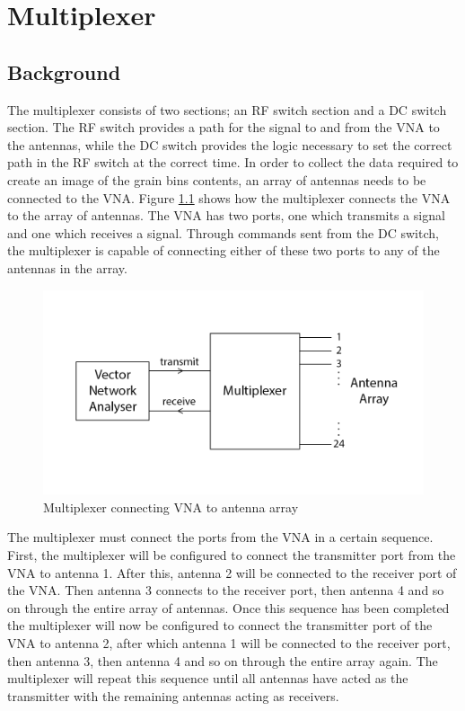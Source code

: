 \chapter{Multiplexer}
\label{sec:Multiplexer}

\section{Background}

The multiplexer consists of two sections; an RF switch section and a DC switch section. The RF switch provides a path for the signal to and from the VNA to the antennas, while the DC switch provides the logic necessary to set the correct path in the RF switch at the correct time. In order to collect the data required to create an image of the grain bins contents, an array of antennas needs to be connected to the VNA. Figure \ref{fig:mp_connections} shows how the multiplexer connects the VNA to the array of antennas. The VNA has two ports, one which transmits a signal and one which receives a signal. Through commands sent from the DC switch, the multiplexer is capable of connecting either of these two ports to any of the antennas in the array.

\begin{figure}[h]
	\begin{center}
		\includegraphics[width=4.5in]{./images/multiplexer_connections.png}
		\caption{Multiplexer connecting VNA to antenna array}
		\label{fig:mp_connections}
	\end{center}
\end{figure}

The multiplexer must connect the ports from the VNA in a certain sequence. First, the multiplexer will be configured to connect the transmitter port from the VNA to antenna 1. After this, antenna 2 will be connected to the receiver port of the VNA. Then antenna 3 connects to the receiver port, then antenna 4 and so on through the entire array of antennas. Once this sequence has been completed the multiplexer will now be configured to connect the transmitter port of the VNA to antenna 2, after which antenna 1 will be connected to the receiver port, then antenna 3, then antenna 4 and so on through the entire array again. The multiplexer will repeat this sequence until all antennas have acted as the transmitter with the remaining antennas acting as receivers.


